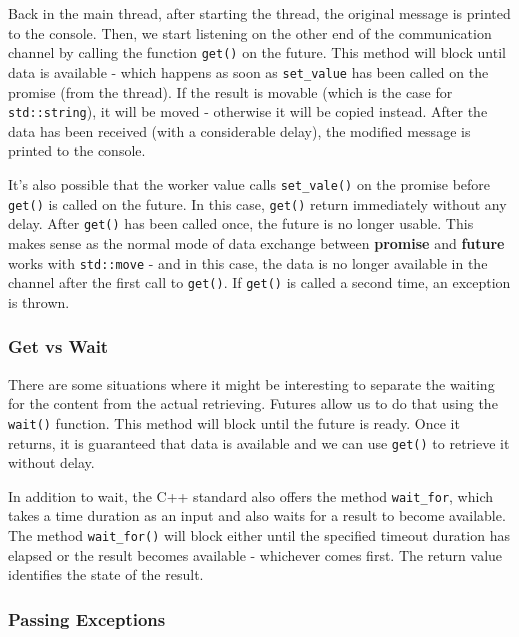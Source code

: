 \documentclass[11pt, a4paper]{article}
\begin{document}
Back in the main thread, after starting the thread, the original message is printed to the console. Then, we start listening on the other end of the communication channel by calling the function \texttt{get()} on the future. This method will block until data is available - which happens as soon as \texttt{set\_value} has been called on the promise (from the thread). If the result is movable (which is the case for \texttt{ std::string}), it will be moved - otherwise it will be copied instead. After the data has been received (with a considerable delay), the modified message is printed to the console.


It's also possible that the worker value calls \texttt{set\_vale()} on the promise before \texttt{get()} is called on the future. In this case, \texttt{get()} return immediately without any delay. After \texttt{get()} has been called once, the future is no longer usable. This makes sense as the normal mode of data exchange between \textbf{promise} and \textbf{future} works with \texttt{std::move} - and in this case, the data is no longer available in the channel after the first call to \texttt{get()}. If \texttt{get()} is called a second time, an exception is thrown.



\subsubsection{Get vs Wait}%
\label{ssub:get_vs_wait}


There are some situations where it might be interesting to separate the waiting for the content from the actual retrieving. Futures allow us to do that using the \texttt{wait()} function. This method will block until the future is ready. Once it returns, it is guaranteed that data is available and we can use \texttt{get()} to retrieve it without delay.



In addition to wait, the C++ standard also offers the method \texttt{wait\_for}, which takes a time duration as an input and also waits for a result to become available. The method \texttt{wait\_for()} will block either until the specified timeout duration has elapsed or the result becomes available - whichever comes first. The return value identifies the state of the result.



\subsubsection{Passing Exceptions}%
\label{ssub:passing_exceptions}
\end{document}
